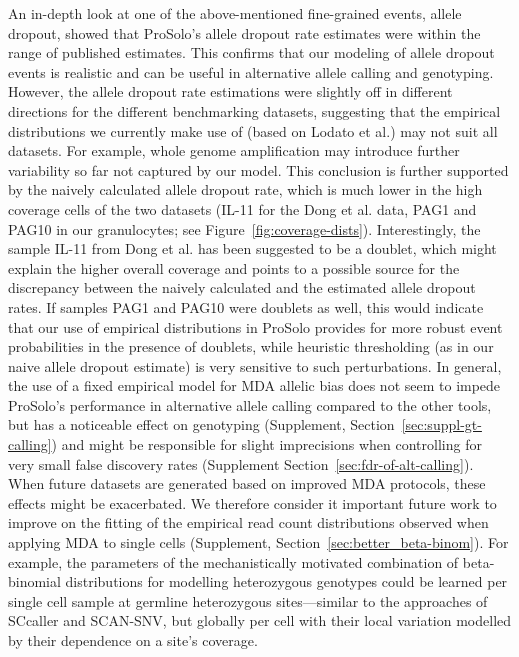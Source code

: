 \documentclass[fleqn,12pt,inline]{wlscirep}
\begin{document}
An in-depth look at one of the above-mentioned fine-grained events, allele dropout, showed that ProSolo's allele dropout rate estimates were within the range of published estimates.
This confirms that our modeling of allele dropout events is realistic and can be useful in alternative allele calling and genotyping.
However, the allele dropout rate estimations were slightly off in different directions for the different benchmarking datasets, suggesting that the empirical distributions we currently make use of (based on Lodato et al.\cite{lodato_somatic_2015}) may not suit all datasets.
For example, whole genome amplification may introduce further variability so far not captured by our model.  
This conclusion is further supported by the naively calculated allele dropout rate, which is much lower in the high coverage cells of the two datasets (IL-11 for the Dong et al. data\cite{dong_accurate_2017}, PAG1 and PAG10 in our granulocytes; see Figure~\ref{fig:coverage-dists}).
Interestingly, the sample IL-11 from Dong et al.\cite{dong_accurate_2017} has been suggested to be a doublet\cite{luquette_identification_2019}, which might explain the higher overall coverage and points to a possible source for the discrepancy between the naively calculated and the estimated allele dropout rates.
If samples PAG1 and PAG10 were doublets as well, this would indicate that our use of empirical distributions in ProSolo provides for more robust event probabilities in the presence of doublets, while heuristic thresholding (as in our naive allele dropout estimate) is very sensitive to such perturbations.
In general, the use of a fixed empirical model for MDA allelic bias does not seem to impede ProSolo's performance in alternative allele calling compared to the other tools, but has a noticeable effect on genotyping (Supplement, Section~\ref{sec:suppl-gt-calling}) and might be responsible for slight imprecisions when controlling for very small false discovery rates (Supplement Section~\ref{sec:fdr-of-alt-calling}).
When future datasets are generated based on improved MDA protocols\cite{lahnemann_eleven_2020}, these effects might be exacerbated.
We therefore consider it important future work to improve on the fitting of the empirical read count distributions observed when applying MDA to single cells (Supplement, Section~\ref{sec:better_beta-binom}).
For example, the parameters of the mechanistically motivated combination of beta-binomial distributions for modelling heterozygous genotypes could be learned per single cell sample at germline heterozygous sites---similar to the approaches of SCcaller and SCAN-SNV, but globally per cell with their local variation modelled by their dependence on a site's coverage.
\end{document}
